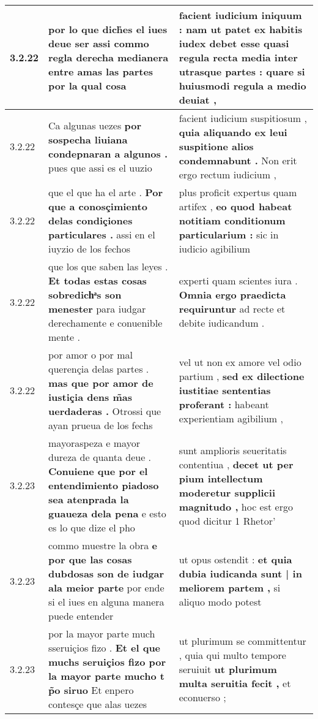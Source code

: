 \begin{tabular}{|p{1cm}|p{6.5cm}|p{6.5cm}|}
3.2.22 & por lo que dich̉es el iues deue ser \textbf{ assi commo regla derecha medianera entre amas las partes } por la qual cosa & facient iudicium iniquum : \textbf{ nam ut patet ex habitis iudex debet esse quasi regula recta media inter utrasque partes : } quare si huiusmodi regula a medio deuiat , \\\hline
3.2.22 & Ca algunas uezes \textbf{ por sospecha liuiana condepnaran a algunos . } pues que assi es el uuzio & facient iudicium suspitiosum , \textbf{ quia aliquando ex leui suspitione alios condemnabunt . } Non erit ergo rectum iudicium , \\\hline
3.2.22 & que el que ha el arte . \textbf{ Por que a conosçimiento delas condiçiones particulares . } assi en el iuyzio de los fechos & plus proficit expertus quam artifex , \textbf{ eo quod habeat notitiam conditionum particularium : } sic in iudicio agibilium \\\hline
3.2.22 & que los que saben las leyes . \textbf{ Et todas estas cosas sobredichͣs son menester } para iudgar derechamente e conuenible mente . & experti quam scientes iura . \textbf{ Omnia ergo praedicta requiruntur } ad recte et debite iudicandum . \\\hline
3.2.22 & por amor o por mal querençia delas partes . \textbf{ mas que por amor de iustiçia dens m̃as uerdaderas . } Otrossi que ayan prueua de los fechs & vel ut non ex amore vel odio partium , \textbf{ sed ex dilectione iustitiae sententias proferant : } habeant experientiam agibilium , \\\hline
3.2.23 & mayoraspeza e mayor dureza de quanta deue . \textbf{ Conuiene que por el entendimiento piadoso sea atenprada la guaueza dela pena } e esto es lo que dize el pho & sunt amplioris seueritatis contentiua , \textbf{ decet ut per pium intellectum moderetur supplicii magnitudo , } hoc est ergo quod dicitur 1 Rhetor’ \\\hline
3.2.23 & commo muestre la obra \textbf{ e por que las cosas dubdosas son de iudgar ala meior parte } por ende si el iues en alguna manera puede entender & ut opus ostendit : \textbf{ et quia dubia iudicanda sunt | in meliorem partem , } si aliquo modo potest \\\hline
3.2.23 & por la mayor parte much sseruiçios fizo . \textbf{ Et el que muchs seruiçios fizo por la mayor parte mucho t p̃o siruo } Et enpero contesçe que alas uezes & ut plurimum se committentur , quia qui multo tempore seruiuit \textbf{ ut plurimum multa seruitia fecit , } et econuerso ; \\\hline

\end{tabular}
